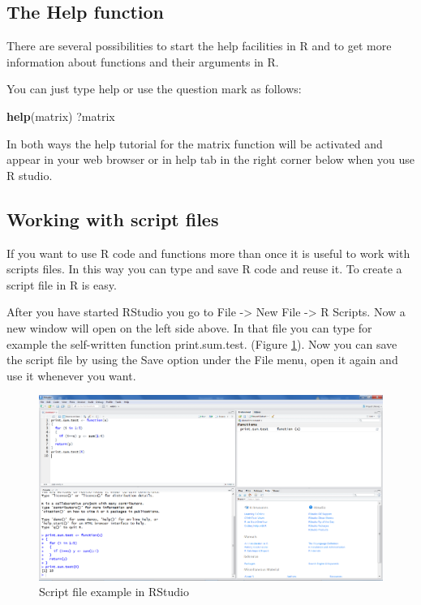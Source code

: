 \documentclass[]{book}
\newenvironment{Shaded}{\begin{snugshade}}{\end{snugshade}}
\newcommand{\KeywordTok}[1]{\textcolor[rgb]{0.13,0.29,0.53}{\textbf{#1}}}
\newcommand{\NormalTok}[1]{#1}
\theoremstyle{definition}
\theoremstyle{definition}
\theoremstyle{definition}
\theoremstyle{remark}
\begin{document}
\subsection{The Help function}\label{the-help-function}

There are several possibilities to start the help facilities in R and to
get more information about functions and their arguments in R.

You can just type help or use the question mark as follows:

\begin{Shaded}
\begin{Highlighting}[]
\KeywordTok{help}\NormalTok{(matrix)}
\NormalTok{?matrix}
\end{Highlighting}
\end{Shaded}

In both ways the help tutorial for the matrix function will be activated
and appear in your web browser or in help tab in the right corner below
when you use R studio.

\subsection{Working with script files}\label{working-with-script-files}

If you want to use R code and functions more than once it is useful to
work with scripts files. In this way you can type and save R code and
reuse it. To create a script file in R is easy.

After you have started RStudio you go to File -\textgreater{} New File
-\textgreater{} R Scripts. Now a new window will open on the left side
above. In that file you can type for example the self-written function
print.sum.test. (Figure \ref{fig:fig11}). Now you can save the script
file by using the Save option under the File menu, open it again and use
it whenever you want.

\begin{figure}

{\centering \includegraphics[width=0.9\linewidth]{images/fig1.11} 

}

\caption{Script file example in RStudio}\label{fig:fig11}
\end{figure}
\end{document}
